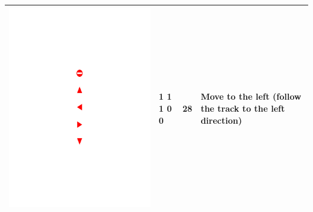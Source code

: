 \begin{table}[!h]
\begin{tabular}{|c|C{2cm}|C{2cm}|C{5cm}|}
		\begin{minipage}{.075\textwidth}\includegraphics[scale=.5,trim=9.1cm 13.5cm 9.5cm 13cm,clip]{signs.pdf}\end{minipage}		& 1 1 1 0 0 & 28 & Move to the left (follow the track to the left direction) \\ \hline

\end{tabular}
\end{table}
